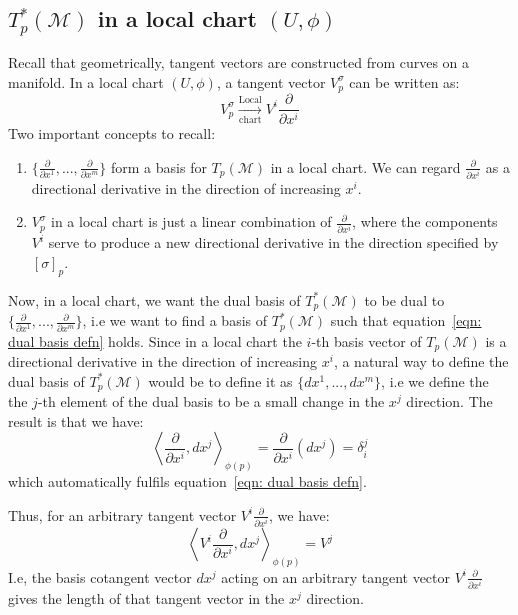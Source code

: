     \subsection{$T^*_p(\mathcal{M})$ in a local chart $(U, \phi)$}
      Recall that geometrically, tangent vectors are constructed from curves
      on a manifold. In a local chart $(U,\phi)$, a tangent vector
      $V^\sigma_p$ can be written as:
      \[V^\sigma_p \xrightarrow[\text{chart}]{\text{Local}} V^i
      \frac{\partial}{\partial x^i}\]
      Two important concepts to recall:
      \begin{enumerate}
        \item{$\{\frac{\partial}{\partial x^1},...,\frac{\partial}{\partial
          x^m}\}$ form a basis for $T_p(\mathcal{M})$ in a local chart. We
          can regard $\frac{\partial}{\partial x^i}$ as a directional
          derivative in the direction of increasing $x^i$.}
        \item{$V^\sigma_p$ in a local chart is just a linear combination of
          $\frac{\partial}{\partial x^i}$, where the components $V^i$ serve to
          produce a new directional derivative in the direction specified by
          $[\sigma]_p$.}
      \end{enumerate}
      Now, in a local chart, we want the dual basis of $T^*_p(\mathcal{M})$
      to be dual to $\{\frac{\partial}{\partial
      x^1},...,\frac{\partial}{\partial x^m}\}$, i.e we want to find a basis
      of $T^*_p(\mathcal{M})$ such that equation~\ref{eqn: dual basis defn}
      holds. Since in a local chart the $i$-th basis vector of
      $T_p(\mathcal{M})$ is a directional derivative in the direction of
      increasing $x^i$, a natural way to define the dual basis of
      $T^*_p(\mathcal{M})$ would be to define it as $\{dx^1,...,dx^m\}$, i.e
      we define the the $j$-th element of the dual basis to be a small change
      in the $x^j$ direction. The result is that we have: \[\left\langle
      \frac{\partial}{\partial x^i}, dx^j \right\rangle_{\phi(p)} =
      \frac{\partial}{\partial x^i}(dx^j) = \delta^j_i\] which automatically
      fulfils equation~\ref{eqn: dual basis defn}.
      
      Thus, for an arbitrary tangent vector $V^i \frac{\partial}{\partial
      x^i}$, we have:
      \[\left\langle V^i \frac{\partial}{\partial x^i}, dx^j
      \right\rangle_{\phi(p)} = V^j \]
      I.e, the basis cotangent vector $dx^j$ acting on an arbitrary tangent
      vector $V^i \frac{\partial}{\partial x^i}$ gives the length of that tangent
      vector in the $x^j$ direction.

